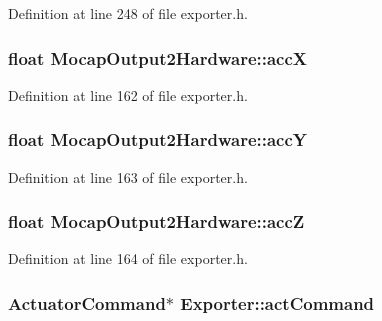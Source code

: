 \-Definition at line 248 of file exporter.\-h.

\hypertarget{group___mo_cap_plugin_ga34811521a55099df3d905b19ab544638}{
\subsubsection[{acc\-X}]{\setlength{\rightskip}{0pt plus 5cm}float {\bf \-Mocap\-Output2\-Hardware\-::acc\-X}}}\label{group___mo_cap_plugin_ga34811521a55099df3d905b19ab544638}


\-Definition at line 162 of file exporter.\-h.

\hypertarget{group___mo_cap_plugin_gad47738d7c1cd424f7d9508b4d44a4043}{
\subsubsection[{acc\-Y}]{\setlength{\rightskip}{0pt plus 5cm}float {\bf \-Mocap\-Output2\-Hardware\-::acc\-Y}}}\label{group___mo_cap_plugin_gad47738d7c1cd424f7d9508b4d44a4043}


\-Definition at line 163 of file exporter.\-h.

\hypertarget{group___mo_cap_plugin_gae919304b20a26d362f67b32533118ce7}{
\subsubsection[{acc\-Z}]{\setlength{\rightskip}{0pt plus 5cm}float {\bf \-Mocap\-Output2\-Hardware\-::acc\-Z}}}\label{group___mo_cap_plugin_gae919304b20a26d362f67b32533118ce7}


\-Definition at line 164 of file exporter.\-h.

\hypertarget{group___mo_cap_plugin_gaaa8cd64f3935d77113b41cf84f398e78}{
\subsubsection[{act\-Command}]{\setlength{\rightskip}{0pt plus 5cm}\-Actuator\-Command$\ast$ {\bf \-Exporter\-::act\-Command}}}\label{group___mo_cap_plugin_gaaa8cd64f3935d77113b41cf84f398e78}


